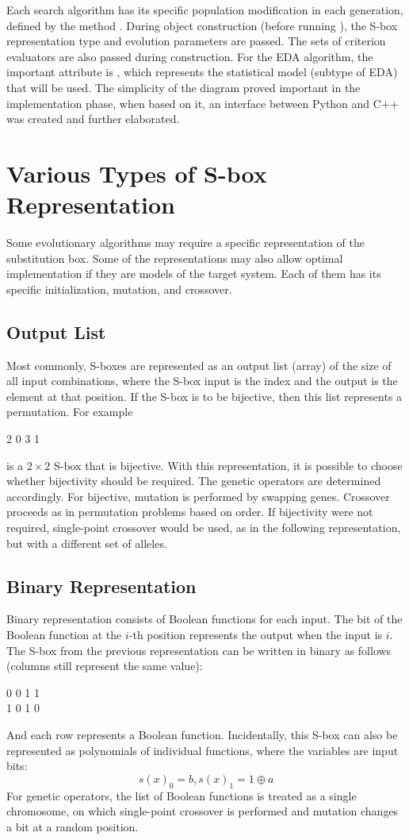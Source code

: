 Each search algorithm has its specific population modification in each generation, defined
by the method .
During object construction (before running ), the S-box representation type and evolution
parameters are passed. The sets of criterion evaluators are also passed during construction.
For the EDA algorithm, the important attribute is , which represents the statistical model
(subtype of EDA) that will be used.
The simplicity of the diagram proved important in the implementation phase, when based on it,
an interface between Python and C++ was created and further elaborated.

\section{Various Types of S-box Representation}\label{secSboxTypes}
Some evolutionary algorithms may require a specific representation of the substitution box.
Some of the representations may also allow optimal implementation if they are models of the target system.
Each of them has its specific initialization, mutation, and crossover.

\subsection{Output List}
Most commonly, S-boxes are represented as an output list (array) of the size of all
input combinations, where the S-box input is the index and the output is the element
at that position. If the S-box is to be bijective, then this list represents a permutation.
For example
\begin{center}
2 0 3 1
\end{center}
is a $2 \times 2$ S-box that is bijective.
With this representation, it is possible to choose whether bijectivity should be required.
The genetic operators are determined accordingly. For bijective, mutation is performed
by swapping genes. Crossover proceeds as in permutation problems based on order.
If bijectivity were not required, single-point crossover would be used, as in the following
representation, but with a different set of alleles.

\subsection{Binary Representation}
Binary representation consists of Boolean functions for each input.
The bit of the Boolean function at the $i$-th position represents the output when the input is $i$.
The S-box from the previous representation can be written in binary as follows (columns still represent the same value):
\begin{center}
0 0 1 1\\
1 0 1 0
\end{center}
And each row represents a Boolean function.
Incidentally, this S-box can also be represented as polynomials of individual functions,
where the variables are input bits:
$$s(x)_0 = b , s(x)_1 = 1 \oplus a$$
For genetic operators, the list of Boolean functions is treated as a single chromosome, on which
single-point crossover is performed and mutation changes a bit at a random position.

